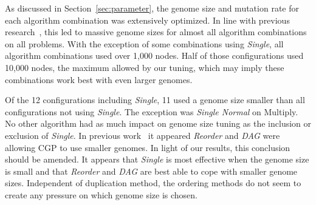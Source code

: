 \documentclass[journal]{IEEEtran}
\begin{document}
As discussed in Section~\ref{sec:parameter}, the genome size and mutation rate
for each algorithm combination was extensively optimized.  In line with previous
research~\cite{miller:2006:redundancy}, this led to massive genome sizes for
almost all algorithm combinations on all problems.  With the exception of 
some combinations using \emph{Single}, all algorithm combinations used over
1,000 nodes.  Half of those configurations used 10,000 nodes, the maximum allowed
by our tuning, which may imply these combinations work best with even larger
genomes.

Of the 12 configurations including \emph{Single}, 11 used a genome size smaller
than all configurations not using \emph{Single}.  The exception was \emph{Single Normal}
on Multiply.  No other algorithm had as much impact on genome size tuning as
the inclusion or exclusion of \emph{Single}.  In previous work~\cite{goldman:2013:ordering}
it appeared \emph{Reorder} and \emph{DAG} were allowing CGP to use smaller genomes.
In light of our results, this conclusion should be amended.
It appears that \emph{Single} is most effective when the genome size is small and
that \emph{Reorder} and \emph{DAG} are best able to cope with smaller genome sizes.
Independent of duplication method, the ordering methods do not seem to create any
pressure on which genome size is chosen.

\begin{comment}
Genome size explosion seems most prevalent on easier problems, with Parity and
Encode having much higher genome sizes than Decode and Multiply.  Initially
this seems counter intuitive, as we would expect harder problems to require
larger solutions which in turn should require larger genomes.  Yet the genome
sizes in use are so far beyond what a solution to these problems require that
solution size is likely not the cause of this behavior.  Instead, consider
the usefulness of unexplored nodes.

On simple enough problems, exploring lots of randomly generated nodes may be
sufficient to generate high quality solutions.  At relatively low numbers of
evaluations, large genotypes likely mean each mutation to a connection gene
will activate nodes that have never been active, resulting in exploration.
At higher numbers of evaluations, mutations to connection genes that are not currently
active have a high chance of connecting to a node that was tested previously
and found ineffective.  As a result, having a smaller genome size on harder problems
may reduce the chance of exploratory mutations when optimizing near the global optimum.

Under this theory, we should expect Parity to have the largest genome sizes
\end{comment}
\end{document}
